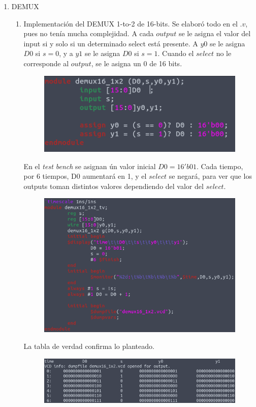 \documentclass[11pt,a4paper]{article}
\begin{document}
\begin{enumerate}
\item DEMUX
\begin{enumerate}[label=(\alph*)]
\item Implementación del DEMUX 1-to-2 de 16-bits. Se elaboró todo en el $.v$, pues no tenía mucha complejidad. A cada $output$ se le asigna el valor del input si y solo si un determinado select está presente. A $y0$ se le asigna $D0$ si $s=0$, y a $y1$ se le asigna $D0$ si $s = 1$. Cuando el $select$ no le corresponde al $output$, se le asigna un 0 de 16 bits.
\begin{figure}[h!]
\centering
\includegraphics[scale=0.5]{16_1x2DEMUX_1.png} 
\end{figure}

En el \textit{test bench} se asignan ún valor inicial $D0 = 16'b01$. Cada tiempo, por 6 tiempos, D0 aumentará en 1, y el $select$ se negará, para ver que los outputs toman distintos valores dependiendo del valor del $select$.
\pagebreak
\begin{figure}[h!]
\centering
\includegraphics[scale=0.4]{16_1x2DEMUX_2.png} 
\end{figure}

La tabla de verdad confirma lo planteado.
\begin{figure}[h!]
\centering
\includegraphics[scale=0.25]{16_1x2DEMUX_3.png} 
\end{figure}


\end{enumerate}
\end{enumerate}
\end{document}
